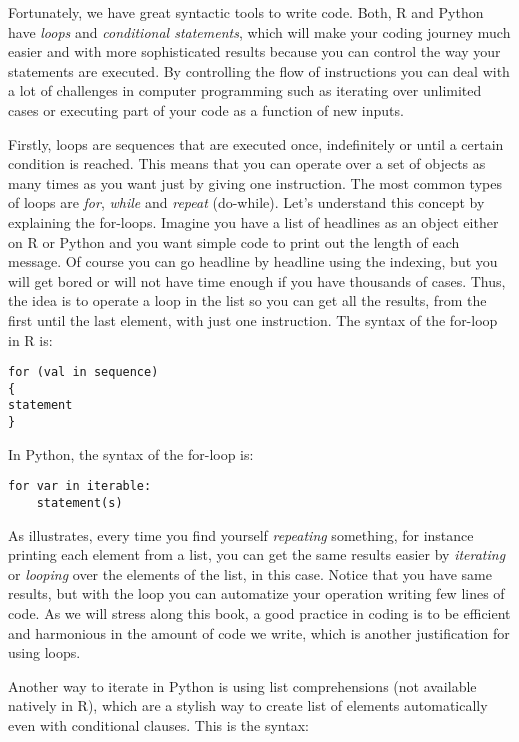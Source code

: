 Fortunately, we have great syntactic tools to write code. Both, R and
Python have \emph{loops} and \emph{conditional statements}, which will
make your coding journey much easier and with more sophisticated
results because you can control the way your statements are
executed. By controlling the flow of instructions you can deal with a
lot of challenges in computer programming such as iterating over
unlimited cases or executing part of your code as a function of new
inputs.

Firstly, loops are sequences that are executed once, indefinitely or
until a certain condition is reached. This means that you can operate
over a set of objects as many times as you want just by giving one
instruction. The most common types of loops are \emph{for},
\emph{while} and \emph{repeat} (do-while). Let’s understand this
concept by explaining the for-loops. Imagine you have a list of
headlines as an object either on R or Python and you want simple code
to print out the length of each message. Of course you can go headline
by headline using the indexing, but you will get bored or will not
have time enough if you have thousands of cases. Thus, the idea is to
operate a loop in the list so you can get all the results, from the
first until the last element, with just one instruction.  The syntax
of the for-loop in R is:

\begin{verbatim}
for (val in sequence)
{
statement
}
\end{verbatim}

In Python, the syntax of the for-loop is:

\begin{verbatim}
for var in iterable:
    statement(s)
\end{verbatim}



As  illustrates, every time you find yourself
\emph{repeating} something, for instance printing each element from a
list, you can get the same results easier by \emph{iterating} or
\emph{looping} over the elements of the list, in this case.  Notice
that you have same results, but with the loop you can automatize your
operation writing few lines of code. As we will stress along this
book, a good practice in coding is to be efficient and harmonious in
the amount of code we write, which is another justification for using
loops.

Another way to iterate in Python is using list comprehensions  (not available natively in R), which are a stylish way to create list of elements automatically even with conditional clauses. This is the syntax:

